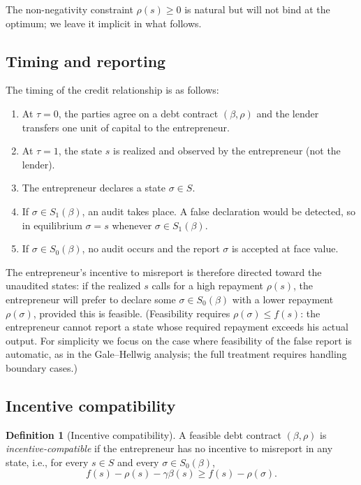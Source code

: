 \documentclass[11pt,a4paper,oneside]{book}
\def\leq{\leqslant}
\def\geq{\geqslant}
\theoremstyle{plain}
\theoremstyle{definition}
\newtheorem{definition}[theorem]{Definition}
\theoremstyle{remark}
\numberwithin{equation}{chapter}
\begin{document}
The non-negativity constraint $\rho(s) \geq 0$ is natural but will not bind at the optimum; we leave it implicit in what follows.

\subsection{Timing and reporting}

The timing of the credit relationship is as follows:
\begin{enumerate}
  \item At $\tau = 0$, the parties agree on a debt contract $(\beta, \rho)$ and the lender transfers one unit of capital to the entrepreneur.
  \item At $\tau = 1$, the state $s$ is realized and observed by the entrepreneur (not the lender).
  \item The entrepreneur declares a state $\sigma \in S$.
  \item If $\sigma \in S_1(\beta)$, an audit takes place.
  A false declaration would be detected, so in equilibrium $\sigma = s$ whenever $\sigma \in S_1(\beta)$.
  \item If $\sigma \in S_0(\beta)$, no audit occurs and the report $\sigma$ is accepted at face value.
\end{enumerate}

The entrepreneur's incentive to misreport is therefore directed toward the unaudited states: if the realized $s$ calls for a high repayment $\rho(s)$, the entrepreneur will prefer to declare some $\sigma \in S_0(\beta)$ with a lower repayment $\rho(\sigma)$, provided this is feasible.
(Feasibility requires $\rho(\sigma) \leq f(s)$: the entrepreneur cannot report a state whose required repayment exceeds his actual output.
For simplicity we focus on the case where feasibility of the false report is automatic, as in the Gale--Hellwig analysis; the full treatment requires handling boundary cases.)

\subsection{Incentive compatibility}

\begin{definition}[Incentive compatibility]\label{def:GH-IC}
A feasible debt contract $(\beta, \rho)$ is \emph{incentive-compatible} if the entrepreneur has no incentive to misreport in any state, i.e., for every $s \in S$ and every $\sigma \in S_0(\beta)$,
\begin{equation}\label{eq:IC-raw}
  f(s) - \rho(s) - \gamma \beta(s) \geq f(s) - \rho(\sigma).
\end{equation}
\end{definition}
\end{document}
